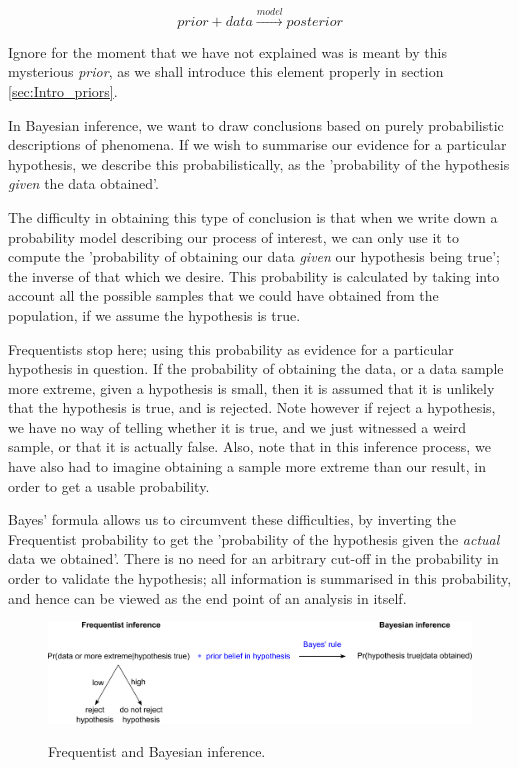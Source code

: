 \documentclass[11pt,fullpage]{book}
\begin{document}
\begin{equation}
prior + data \xrightarrow{model} posterior
\end{equation}

Ignore for the moment that we have not explained was is meant by this mysterious \textit{prior}, as we shall introduce this element properly in section \ref{sec:Intro_priors}. 

In Bayesian inference, we want to draw conclusions based on purely probabilistic descriptions of phenomena. If we wish to summarise our evidence for a particular hypothesis, we describe this probabilistically, as the 'probability of the hypothesis \textit{given} the data obtained'. 

The difficulty in obtaining this type of conclusion is that when we write down a probability model describing our process of interest, we can only use it to compute the 'probability of obtaining our data \textit{given} our hypothesis being true'; the inverse of that which we desire. This probability is calculated by taking into account all the possible samples that we could have obtained from the population, if we assume the hypothesis is true. 

Frequentists stop here; using this probability as evidence for a particular hypothesis in question. If the probability of obtaining the data, or a data sample more extreme, given a hypothesis is small, then it is assumed that it is unlikely that the hypothesis is true, and is rejected. Note however if reject a hypothesis, we have no way of telling whether it is true, and we just witnessed a weird sample, or that it is actually false. Also, note that in this inference process, we have also had to imagine obtaining a sample more extreme than our result, in order to get a usable probability. 

Bayes' formula allows us to circumvent these difficulties, by inverting the Frequentist probability to get the 'probability of the hypothesis given the \textit{actual} data we obtained'. There is no need for an arbitrary cut-off in the probability in order to validate the hypothesis; all information is summarised in this probability, and hence can be viewed as the end point of an analysis in itself.

\begin{figure}
\centering
\scalebox{0.4} 
{\includegraphics{Intro_BayesVsFrequentist.pdf}}
\caption{Frequentist and Bayesian inference.}\label{fig:Intro_BayesVsFrequentist}
\end{figure}
\end{document}
